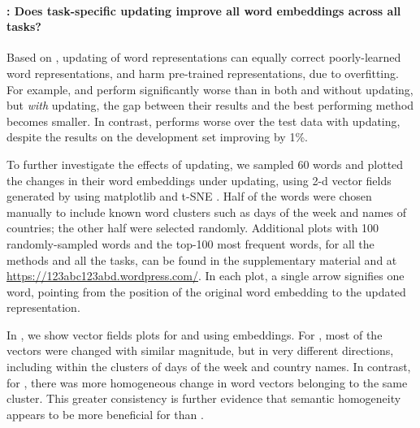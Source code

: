 \paragraph{\RQ[3]: Does task-specific updating improve all word embeddings across all tasks?}
Based on , updating of word representations can
equally correct poorly-learned word representations, and harm
pre-trained representations, due to overfitting.
For example, \CW and \Glove perform significantly worse than \Skipgram
in both \pos and \ner without updating, but \emph{with} updating, the
gap between their results and the best performing method becomes
smaller. In contrast, \Skipgram performs worse over the test data with
updating, despite the results on the development set improving by 1\%.

To further investigate the effects of updating, we sampled 60 words and
plotted the changes in their word embeddings under updating, using 2-d
vector fields generated by using matplotlib and t-SNE \cite{vanderMaaten:Hinton:2008}. Half
of the words were chosen manually to include known word clusters such as
days of the week and names of countries; the other half were selected
randomly. Additional plots with 100 randomly-sampled words and the
top-100 most frequent words, for all the methods and all the tasks, can
be found in the supplementary material and at
\url{https://123abc123abd.wordpress.com/}.  In each plot, a single arrow
signifies one word, pointing from the position of the original word embedding to the updated representation.

In , we show vector fields plots for \chunking and \ner using \Skipgram embeddings.
For \chunking, most of the vectors were changed with similar magnitude,
but in very different directions, including within the clusters of days of
the week and country names.
In contrast, for \ner, there was more homogeneous change in word vectors
belonging to the same cluster.
This greater consistency is further evidence that semantic homogeneity
appears to be more beneficial for \ner than \chunking. 


